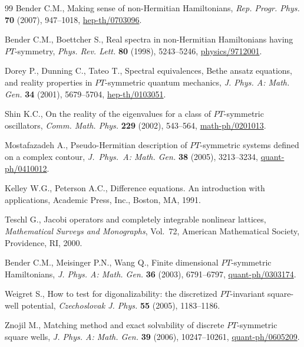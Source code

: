 \documentclass[11pt]{article}
\numberwithin{equation}{section}
\begin{document}
\begin{thebibliography}{99}
\bibitem[1]{[1]} Bender C.M., Making sense of non-Hermitian Hamiltonians,
\textit{Rep. Progr. Phys.} \textbf{70} (2007), 947--1018, \mbox{\href{http://arxiv.org/abs/hep-th/0703096}{hep-th/0703096}}.

\bibitem[2]{[2]} Bender C.M., Boettcher S., Real spectra in non-Hermitian
Hamiltonians having $PT$-symmetry, \textit{Phys. Rev. Lett.} \textbf{80}
(1998), 5243--5246, \href{http://arxiv.org/abs/physics/9712001}{physics/9712001}.

\bibitem[3]{[3]} Dorey P., Dunning C., Tateo T., Spectral equivalences, Bethe
ansatz equations, and reality properties in $PT$-symmetric quantum
mechanics, \textit{J. Phys. A: Math. Gen.} \textbf{34} (2001), 5679--5704, \href{http://arxiv.org/abs/hep-th/0103051}{hep-th/0103051}.

\bibitem[4]{[4]} Shin K.C., On the reality of the eigenvalues for a class of $PT$-symmetric oscillators, \textit{Comm. Math. Phys.} \textbf{229}
(2002), 543--564, \href{http://arxiv.org/abs/math-ph/0201013}{math-ph/0201013}.

\bibitem[5]{[5]} Mostafazadeh A., Pseudo-Hermitian description of $PT$-symmetric systems def\/ined on a complex contour, \textit{J.~Phys.~A: Math.
Gen.} \textbf{38} (2005), 3213--3234, \href{http://arxiv.org/abs/quant-ph/0410012}{quant-ph/0410012}.

\bibitem[6]{[6]} Kelley W.G., Peterson A.C., Dif\/ference equations. An
introduction with applications, Academic Press, Inc., Boston, MA,  1991.

\bibitem[7]{[7]} Teschl G., Jacobi operators and completely integrable
nonlinear lattices, {\it Mathematical Surveys and Monographs}, Vol.~72, American Mathematical Society, Providence, RI, 2000.

\bibitem[8]{[8]} Bender C.M., Meisinger P.N., Wang Q., Finite dimensional $PT$-symmetric Hamiltonians, \textit{J. Phys. A: Math. Gen.} \textbf{36} (2003), 6791--6797, \href{http://arxiv.org/abs/quant-ph/0303174}{quant-ph/0303174}.

\bibitem[9]{[9]} Weigret S., How to test for digonalizability: the discretized $PT$-invariant square-well potential, \textit{Czechoslovak J. Phys.} \textbf{55}
(2005), 1183--1186.

\bibitem[10]{[10]} Znojil M., Matching method and exact solvability of discrete $PT$-symmetric square wells, \textit{J. Phys. A: Math. Gen.} \textbf{39}
(2006), 10247--10261, \href{http://arxiv.org/abs/quant-ph/0605209}{quant-ph/0605209}.


\end{thebibliography}
\end{document}
